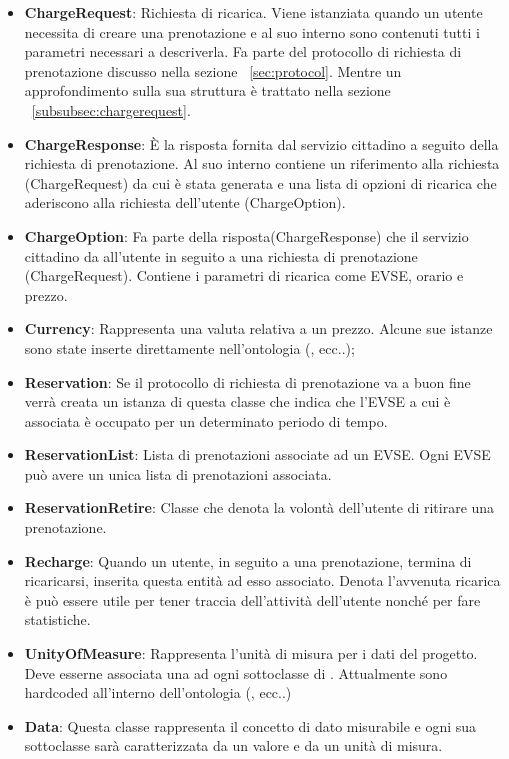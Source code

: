 \begin{itemize}
	\item \textbf{ChargeRequest}: Richiesta di ricarica. Viene istanziata quando un utente necessita di creare una prenotazione e al suo interno sono contenuti tutti i parametri necessari a descriverla. Fa parte del protocollo di richiesta di prenotazione discusso nella sezione ~\ref{sec:protocol}. Mentre un approfondimento sulla sua struttura è trattato nella sezione ~\ref{subsubsec:chargerequest}.
	\item \textbf{ChargeResponse}: È la risposta fornita dal servizio cittadino a seguito della richiesta di prenotazione. Al suo interno contiene un riferimento alla richiesta (ChargeRequest) da cui è stata generata e una lista di opzioni di ricarica che aderiscono alla richiesta dell'utente (ChargeOption).
	\item \textbf{ChargeOption}: Fa parte della risposta(ChargeResponse) che il servizio cittadino da all'utente in seguito a una richiesta di prenotazione (ChargeRequest). Contiene i parametri di ricarica come EVSE, orario e prezzo. 
	\item \textbf{Currency}: Rappresenta una valuta relativa a un prezzo. Alcune sue istanze sono state inserte direttamente nell'ontologia (,  ecc..);
	\item \textbf{Reservation}: Se il protocollo di richiesta di prenotazione va a buon fine verrà creata un istanza di questa classe che indica che l'EVSE a cui è associata è occupato per un determinato periodo di tempo. 
	\item \textbf{ReservationList}: Lista di prenotazioni associate ad un EVSE. Ogni EVSE può avere un unica lista di prenotazioni associata.
	\item \textbf{ReservationRetire}: Classe che denota la volontà dell'utente di ritirare una prenotazione.
	\item \textbf{Recharge}: Quando un utente, in seguito a una prenotazione, termina di ricaricarsi, inserita questa entità ad esso associato. Denota l'avvenuta ricarica è può essere utile per tener traccia dell'attività dell'utente nonché per fare statistiche.
	\item \textbf{UnityOfMeasure}: Rappresenta l'unità di misura per i dati del progetto. Deve esserne associata una ad ogni sottoclasse di . Attualmente sono hardcoded all'interno dell'ontologia (,  ecc..) 	
	\item \textbf{Data}: Questa classe rappresenta il concetto di dato misurabile e ogni sua sottoclasse sarà caratterizzata da un valore e da un unità di misura.
\end{itemize}

